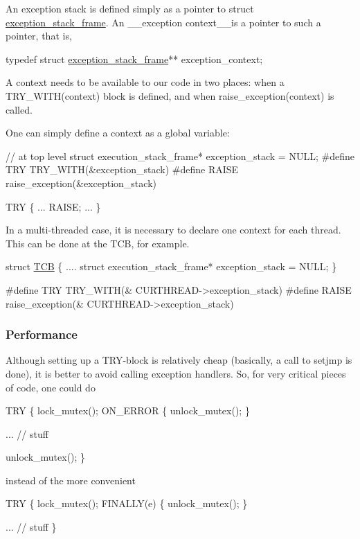 An exception stack is defined simply as a pointer to {\ttfamily struct \hyperlink{structexception__stack__frame}{exception\+\_\+stack\+\_\+frame}}. An \+\_\+\+\_\+exception context\+\_\+\+\_\+is a pointer to such a pointer, that is, 
\begin{DoxyCode}
\textcolor{keyword}{typedef} \textcolor{keyword}{struct }\hyperlink{structexception__stack__frame}{exception\_stack\_frame}** exception\_context;
\end{DoxyCode}
 A context needs to be available to our code in two places\+: when a {\ttfamily T\+R\+Y\+\_\+\+W\+I\+T\+H(context)} block is defined, and when {\ttfamily raise\+\_\+exception(context)} is called.

One can simply define a context as a global variable\+: 
\begin{DoxyCode}
\textcolor{comment}{// at top level}
\textcolor{keyword}{struct }execution\_stack\_frame* exception\_stack = NULL;
\textcolor{preprocessor}{#define TRY  TRY\_WITH(&exception\_stack)}
\textcolor{preprocessor}{#define RAISE  raise\_exception(&exception\_stack)}

TRY \{
    ...
    RAISE;
    ...
\}
\end{DoxyCode}


In a multi-\/threaded case, it is necessary to declare one context for each thread. This can be done at the T\+CB, for example.


\begin{DoxyCode}
\textcolor{keyword}{struct }\hyperlink{structthread__control__block}{TCB} \{
    ....
    \textcolor{keyword}{struct }execution\_stack\_frame* exception\_stack = NULL;   
\}

\textcolor{preprocessor}{#define TRY  TRY\_WITH(& CURTHREAD->exception\_stack)}
\textcolor{preprocessor}{#define RAISE  raise\_exception(& CURTHREAD->exception\_stack)}
\end{DoxyCode}


\subsubsection*{Performance}

Although setting up a T\+R\+Y-\/block is relatively cheap (basically, a call to {\ttfamily setjmp} is done), it is better to avoid calling exception handlers. So, for very critical pieces of code, one could do 
\begin{DoxyCode}
TRY \{
    lock\_mutex();
    ON\_ERROR \{
        unlock\_mutex();
    \}

    ... \textcolor{comment}{// stuff}

    unlock\_mutex();
\}
\end{DoxyCode}
 instead of the more convenient 
\begin{DoxyCode}
TRY \{
    lock\_mutex();
    FINALLY(e) \{
        unlock\_mutex();
    \}

    ... \textcolor{comment}{// stuff    }
\}
\end{DoxyCode}


